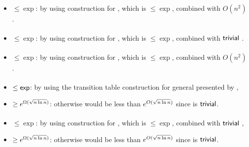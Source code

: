 \paragraph{\OMOLA{}\tto\TDFA}
\begin{itemize}
	\item $\le\exp$: by using construction for \hyperref[cost:OM1LAto1NFAu]{\OMOLA{}\tto\ONFA}, which is $\le\exp$, combined with $O(n^2)$ \ONFA{}\tto\TDFA.
\end{itemize}
\paragraph{\OMOLA{}\tto\TNFA}
\begin{itemize}
	\item $\le\exp$: by using construction for \hyperref[cost:OM1LAto1NFAu]{\OMOLA{}\tto\ONFA}, which is $\le\exp$, combined with $\mathsf{trivial}$ \ONFA{}\tto\TNFA.
\end{itemize}
\paragraph{\OMOLA{}\tto\OMODLA}
\begin{itemize}
	\item $\le\exp$: by using construction for \hyperref[cost:OM1LAto1NFAu]{\OMOLA{}\tto\ONFA}, which is $\le\exp$, combined with $O(n^2)$ \hyperref[cost:1NFAtoOM1DLAu]{\ONFA{}\tto\OMODLA}.
\end{itemize}
\paragraph{\OMODLA{}\tto\ODFA}\label{cost:OM1DLAto1DFAu}
\begin{itemize}
	\item $\le\mathsf{exp}$: by using the transition table construction for general \ODLA presented by ,
	\item $\ge e^{\Omega(\sqrt{n\ln n})}$: otherwise \hyperref[cost:2DFAto1DFAu]{\TDFA{}\tto\ODFA} would be less than $e^{O(\sqrt{n\ln n})}$ since \TDFA{}\tto\OMODLA is $\mathsf{trivial}$.
\end{itemize}
\paragraph{\OMODLA{}\tto\ONFA}
\begin{itemize}
	\item $\le\exp$: by using construction for \hyperref[cost:OM1DLAto1DFAu]{\OMODLA{}\tto\ODFA}, which is $\le\exp$, combined with $\mathsf{trivial}$ \ODFA{}\tto\ONFA,
	\item $\ge e^{\Omega(\sqrt{n\ln n})}$: otherwise \hyperref[cost:2DFAto1NFAu]{\TDFA{}\tto\ONFA} would be less than $e^{O(\sqrt{n\ln n})}$ since \TDFA{}\tto\OMODLA is $\mathsf{trivial}$.
\end{itemize}
